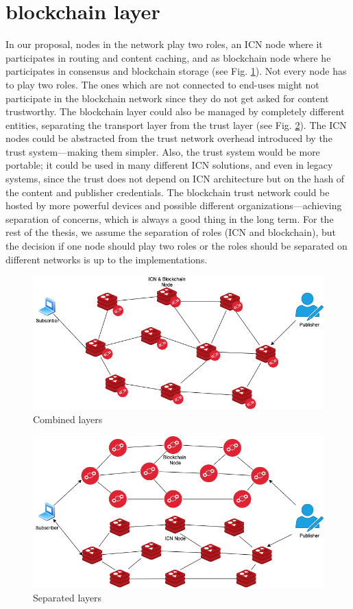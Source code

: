 \section{blockchain layer}
In our proposal, nodes in the network play two roles, an ICN node where it participates in routing and content caching, and as blockchain node where he participates in consensus and blockchain storage (see Fig. \ref{fig:combined_layers}). Not every node has to play two roles. The ones which are not connected to end-uses might not participate in the blockchain network since they do not get asked for content trustworthy. 
The blockchain layer could also be managed by completely different entities, separating the transport layer from the trust layer (see Fig. \ref{fig:separated_layers}). The ICN nodes could be abstracted from the trust network overhead introduced by the trust system––making them simpler. Also, the trust system would be more portable; it could be used in many different ICN solutions, and even in legacy systems, since the trust does not depend on ICN architecture but on the hash of the content and publisher credentials. The blockchain trust network could be hosted by more powerful devices and possible different organizations––achieving separation of concerns, which is always a good thing in the long term. For the rest of the thesis, we assume the separation of roles (ICN and blockchain), but the decision if one node should play two roles or the roles should be separated on different networks is up to the implementations.
\begin{figure}[h!]
\centering
\includegraphics[width=1\textwidth]{img/combined-layers.png}
\caption{Combined layers}
\label{fig:combined_layers}
\end{figure}

\begin{figure}[h!]
\centering
\includegraphics[width=1\textwidth]{img/separated-layers.png}
\caption{Separated layers}
\label{fig:separated_layers}
\end{figure}

